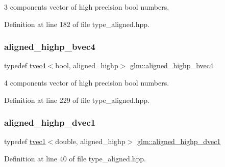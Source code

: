 3 components vector of high precision bool numbers. 



Definition at line 182 of file type\+\_\+aligned.\+hpp.

\mbox{\label{group__gtc__type__aligned_ga2e41bbaacd4df8babd91b4e2f21cb8dd}} 
\subsubsection{\texorpdfstring{aligned\_highp\_bvec4}{aligned\_highp\_bvec4}}
{\footnotesize\ttfamily typedef \mbox{\hyperlink{structglm_1_1tvec4}{tvec4}}$<$bool, aligned\+\_\+highp$>$ \mbox{\hyperlink{group__gtc__type__aligned_ga2e41bbaacd4df8babd91b4e2f21cb8dd}{glm\+::aligned\+\_\+highp\+\_\+bvec4}}}



4 components vector of high precision bool numbers. 



Definition at line 229 of file type\+\_\+aligned.\+hpp.

\mbox{\label{group__gtc__type__aligned_ga14f56809d9577d7f1c3c8fc77651c671}} 
\subsubsection{\texorpdfstring{aligned\_highp\_dvec1}{aligned\_highp\_dvec1}}
{\footnotesize\ttfamily typedef \mbox{\hyperlink{structglm_1_1tvec1}{tvec1}}$<$double, aligned\+\_\+highp$>$ \mbox{\hyperlink{group__gtc__type__aligned_ga14f56809d9577d7f1c3c8fc77651c671}{glm\+::aligned\+\_\+highp\+\_\+dvec1}}}



Definition at line 40 of file type\+\_\+aligned.\+hpp.

\mbox{\label{group__gtc__type__aligned_gaaaaceecde7bb178eebc873836c7e6009}} 
